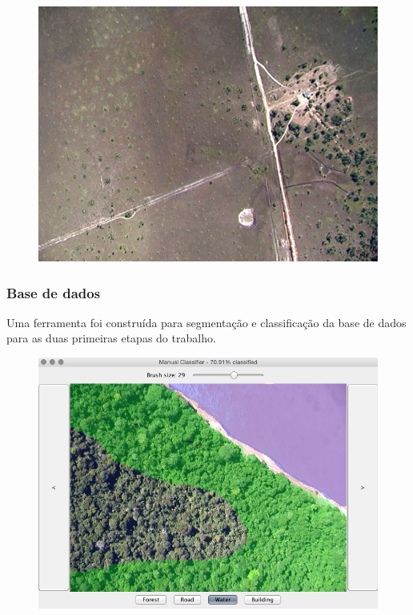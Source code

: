 \documentclass[t]{beamer}
\begin{document}
\begin{frame}
\begin{multicols}{3}
\begin{figure}
		\end{figure}
		\begin{figure}
			\includegraphics[scale=0.3]{imgs/amostra3}
		\end{figure}
	\end{multicols}

\end{frame}

\begin{frame}
	\frametitle{Base de dados}

	Uma ferramenta foi construída para segmentação e classificação da base de dados para as duas primeiras etapas do trabalho.

	\begin{figure}[h]
  		\centering
		\includegraphics[scale=0.25]{imgs/visualClassifier}
	\end{figure}

\end{frame}
\end{document}
